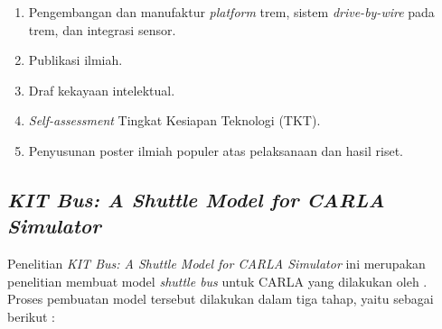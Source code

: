 \begin{enumerate}
    \item Pengembangan dan manufaktur \textit{platform} trem, sistem
    \textit{drive-by-wire} pada trem, dan integrasi sensor.

    \item Publikasi ilmiah.
    \item Draf kekayaan intelektual.
    \item \textit{Self-assessment} Tingkat Kesiapan Teknologi (TKT).
    \item Penyusunan poster ilmiah populer atas pelaksanaan dan hasil riset.

\end{enumerate}

\subsection{\textit{KIT Bus: A Shuttle Model for CARLA Simulator}}

Penelitian \textit{KIT Bus: A Shuttle Model for CARLA Simulator} ini merupakan
penelitian membuat model \textit{shuttle bus} untuk CARLA yang dilakukan oleh
\cite{related-work-xiang}. Proses pembuatan model tersebut dilakukan dalam tiga
tahap, yaitu sebagai berikut \parencite{related-work-xiang}:

